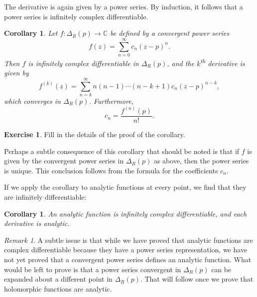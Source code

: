 \documentclass[12pt,openany]{book}
\newcommand{\C}{{\mathbb{C}}}
\theoremstyle{plain}
\newtheorem{cor}[thm]{Corollary}
\theoremstyle{remark}
\newtheorem{remark}[thm]{Remark}
\theoremstyle{definition}
\newenvironment{exbox}{%
    \def\FrameCommand{\vrule width 1pt \relax\hspace {10pt}}%
    \MakeFramed {\advance \hsize -\width \FrameRestore }%
}{%
    \endMakeFramed
}
\theoremstyle{exercise}
\newtheorem{exercise}{Exercise}[section]
\theoremstyle{example}
\begin{document}
The derivative is again given by a power series.
By induction, it follows that a power series is infinitely complex
differentiable.

\begin{cor} \label{cor:convpowserinfdif}
Let $f \colon \Delta_R(p) \to \C$ be defined by a convergent power series
\begin{equation*}
f(z) = \sum_{n=0}^\infty c_n {(z-p)}^n .
\end{equation*}
Then $f$ is infinitely complex differentiable in $\Delta_R(p)$,
and the $k$\textsuperscript{th} derivative is given by
\begin{equation*}
f^{(k)}(z) = \sum_{n=k}^\infty n(n-1)\cdots(n-k+1) c_n {(z-p)}^{n-k} ,
\end{equation*}
which converges in $\Delta_R(p)$.
Furthermore,
\begin{equation*}
c_n =
\frac{f^{(n)}(p)}{n!} .
\end{equation*}
\end{cor}

\begin{exbox}
\begin{exercise}
Fill in the details of the proof of the corollary.
\end{exercise}
\end{exbox}

Perhaps a subtle consequence of
this corollary that should be
noted is that if $f$ is given by the convergent power series in
$\Delta_R(p)$ as above, then the power series is unique.  This conclusion
follows from the formula for the coefficients $c_n$.

If we apply the corollary to analytic functions at every point,
we find that they are infinitely differentiable:

\begin{cor} \label{cor:analinfdif}
An analytic function is infinitely complex differentiable, and each
derivative is analytic.
\end{cor}

\begin{remark}
A subtle issue is that while we have proved that analytic functions are
complex differentiable because they have a power series representation,
we have not yet proved that a convergent power series defines an analytic
function.  What would be left to prove is that a power series convergent
in $\Delta_R(p)$ can be
expanded about a different point in $\Delta_R(p)$.  That will follow
once we prove that holomorphic functions are analytic.
\end{remark}
\end{document}
